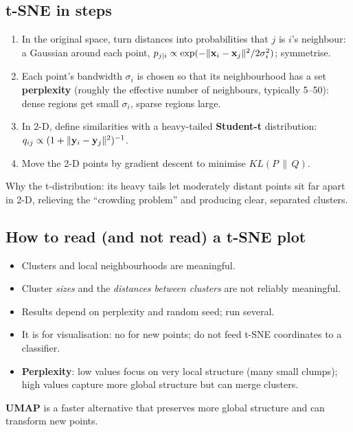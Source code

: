 \subsection{t-SNE in steps}
\begin{enumerate}
\item In the original space, turn distances into probabilities that $j$ is $i$'s neighbour: a Gaussian around each point, $p_{j|i}\propto
  \exp(-\lVert \mathbf x_i - \mathbf x_j\rVert^2/2\sigma_i^2)$; symmetrise.
\item Each point's bandwidth $\sigma_i$ is chosen so that its neighbourhood has a set \textbf{perplexity} (roughly the effective number of
  neighbours, typically 5--50): dense regions get small $\sigma_i$, sparse regions large.
\item In 2-D, define similarities with a heavy-tailed \textbf{Student-t} distribution: $q_{ij}\propto(1 + \lVert \mathbf y_i - \mathbf y_j\rVert^2)^{-1}$.
\item Move the 2-D points by gradient descent to minimise $KL(P\,\|\,Q)$.
\end{enumerate}
Why the t-distribution: its heavy tails let moderately distant points sit far apart in 2-D, relieving the ``crowding problem'' and producing
clear, separated clusters.

\subsection{How to read (and not read) a t-SNE plot}
\begin{itemize}
\item Clusters and local neighbourhoods are meaningful.
\item Cluster \emph{sizes} and the \emph{distances between clusters} are not reliably meaningful.
\item Results depend on perplexity and random seed; run several.
\item It is for visualisation: no  for new points; do not feed t-SNE coordinates to a classifier.
\item \textbf{Perplexity}: low values focus on very local structure (many small clumps); high values capture more global structure but can
  merge clusters.
\end{itemize}
\textbf{UMAP} is a faster alternative that preserves more global structure and can transform new points.

